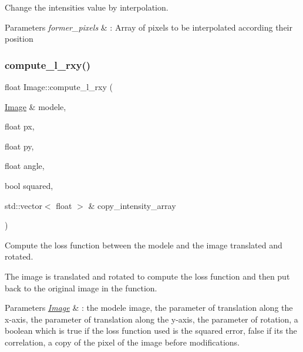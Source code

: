 Change the intensities value by interpolation. 


\begin{DoxyParams}{Parameters}
{\em former\+\_\+pixels} & \+: Array of pixels to be interpolated according their position \\
\hline
\end{DoxyParams}
\mbox{\label{class_image_aa78a6f93d0f09b8f9691398533049215}} 
\subsubsection{\texorpdfstring{compute\+\_\+l\+\_\+rxy()}{compute\_l\_rxy()}}
{\footnotesize\ttfamily float Image\+::compute\+\_\+l\+\_\+rxy (\begin{DoxyParamCaption}\item[{\hyperlink{class_image}{Image} \&}]{modele,  }\item[{float}]{px,  }\item[{float}]{py,  }\item[{float}]{angle,  }\item[{bool}]{squared,  }\item[{std\+::vector$<$ float $>$ \&}]{copy\+\_\+intensity\+\_\+array }\end{DoxyParamCaption})}



Compute the loss function between the modele and the image translated and rotated. 

The image is translated and rotated to compute the loss function and then put back to the original image in the function.


\begin{DoxyParams}{Parameters}
{\em \hyperlink{class_image}{Image}} & \+: the modele image, the parameter of translation along the x-\/axis, the parameter of translation along the y-\/axis, the parameter of rotation, a boolean which is true if the loss function used is the squared error, false if it\textquotesingle{}s the correlation, a copy of the pixel of the image before modifications. \\
\hline
\end{DoxyParams}
\mbox{\label{class_image_a9a3520176760ee55dfd4ce22f7d1290f}} 
